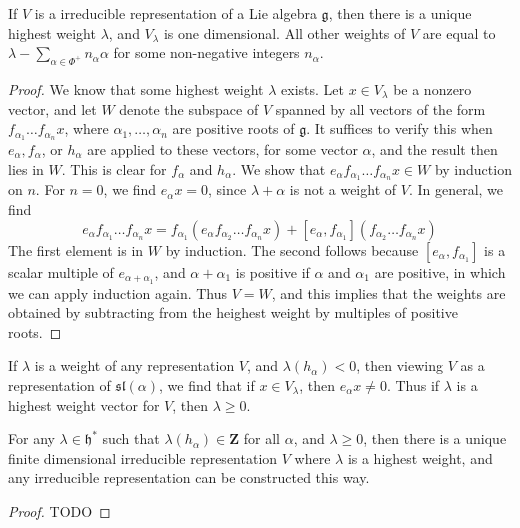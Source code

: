 \begin{lemma}
    If $V$ is a irreducible representation of a Lie algebra $\mathfrak{g}$, then there is a unique highest weight $\lambda$, and $V_\lambda$ is one dimensional. All other weights of $V$ are equal to $\lambda - \sum_{\alpha \in \Phi^+} n_\alpha \alpha$ for some non-negative integers $n_\alpha$.
\end{lemma}
\begin{proof}
    We know that some highest weight $\lambda$ exists. Let $x \in V_\lambda$ be a nonzero vector, and let $W$ denote the subspace of $V$ spanned by all vectors of the form $f_{\alpha_1} \dots f_{\alpha_n} x$, where $\alpha_1, \dots, \alpha_n$ are positive roots of $\mathfrak{g}$. It suffices to verify this when $e_\alpha, f_\alpha$, or $h_\alpha$ are applied to these vectors, for some vector $\alpha$, and the result then lies in $W$. This is clear for $f_\alpha$ and $h_\alpha$. We show that $e_\alpha f_{\alpha_1} \dots f_{\alpha_n} x \in W$ by induction on $n$. For $n = 0$, we find $e_\alpha x = 0$, since $\lambda + \alpha$ is not a weight of $V$. In general, we find
    \[ e_\alpha f_{\alpha_1} \dots f_{\alpha_n} x = f_{\alpha_1} (e_\alpha f_{\alpha_2} \dots f_{\alpha_n} x) + [e_\alpha, f_{\alpha_1}](f_{\alpha_2} \dots f_{\alpha_n} x) \]
    The first element is in $W$ by induction. The second follows because $[e_\alpha, f_{\alpha_1}]$ is a scalar multiple of $e_{\alpha + \alpha_1}$, and $\alpha + \alpha_1$ is positive if $\alpha$ and $\alpha_1$ are positive, in which we can apply induction again. Thus $V = W$, and this implies that the weights are obtained by subtracting from the heighest weight by multiples of positive roots.
\end{proof}

If $\lambda$ is a weight of any representation $V$, and $\lambda(h_\alpha) < 0$, then viewing $V$ as a representation of $\mathfrak{sl}(\alpha)$, we find that if $x \in V_\lambda$, then $e_\alpha x \neq 0$. Thus if $\lambda$ is a highest weight vector for $V$, then $\lambda \geq 0$.

\begin{theorem}
    For any $\lambda \in \mathfrak{h}^*$ such that $\lambda(h_\alpha) \in \mathbf{Z}$ for all $\alpha$, and $\lambda \geq 0$, then there is a unique finite dimensional irreducible representation $V$ where $\lambda$ is a highest weight, and any irreducible representation can be constructed this way.
\end{theorem}
\begin{proof}
    TODO
\end{proof}

